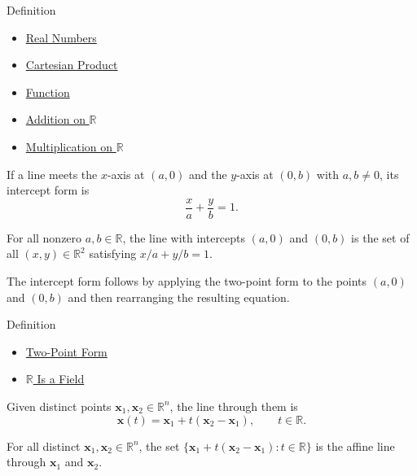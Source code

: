 \begin{definitionbox}{Definition}

\begin{dependencies}
\begin{itemize}
  \item \hyperref[def:reals]{Real Numbers}
  \item \hyperref[def:cartesian-product]{Cartesian Product}
  \item \hyperref[def:function]{Function}
  \item \hyperref[def:addition-on-r]{Addition on $\mathbb{R}$}
  \item \hyperref[def:multiplication-on-r]{Multiplication on $\mathbb{R}$}
\end{itemize}
\end{dependencies}
\begin{definition}
\label{def:intercept-form}
If a line meets the $x$-axis at $(a,0)$ and the $y$-axis at $(0,b)$ with
$a,b\neq 0$, its intercept form is
\[
  \frac{x}{a}+\frac{y}{b}=1.
\]
\end{definition}
\end{definitionbox}\begin{remark*}
For all nonzero $a,b\in\mathbb{R}$, the line with intercepts $(a,0)$ and
$(0,b)$ is the set of all $(x,y)\in\mathbb{R}^2$ satisfying
$x/a+y/b=1$.
\end{remark*}

\begin{remark*}[Derivation]
The intercept form follows by applying the two-point form to the points
$(a,0)$ and $(0,b)$ and then rearranging the resulting equation.
\end{remark*}

\begin{definitionbox}{Definition}

\begin{dependencies}
\begin{itemize}
  \item \hyperref[def:two-point-form]{Two-Point Form}
  \item \hyperref[thm:r-is-a-field]{$\mathbb{R}$ Is a Field}
\end{itemize}
\end{dependencies}
\begin{definition}
\label{def:affine-parametric-line}
Given distinct points $\mathbf x_1,\mathbf x_2\in\mathbb{R}^n$, the line
through them is
\[
  \mathbf x(t)=\mathbf x_1+t(\mathbf x_2-\mathbf x_1),
  \qquad t\in\mathbb{R}.
\]
\end{definition}
\end{definitionbox}\begin{remark*}
For all distinct $\mathbf x_1,\mathbf x_2\in\mathbb{R}^n$, the set
$\{\mathbf x_1+t(\mathbf x_2-\mathbf x_1):t\in\mathbb{R}\}$ is the affine
line through $\mathbf x_1$ and $\mathbf x_2$.
\end{remark*}

